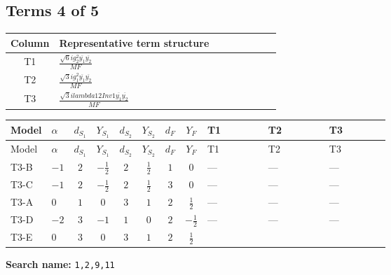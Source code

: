 \documentclass[8pt]{article}
\begin{document}
\begin{landscape}
\subsection*{Terms 4 of 5}
\begin{center}
\begin{tabular}{@{}c >{\raggedright\arraybackslash}p{0.82\linewidth}@{}}
\toprule
Column & Representative term structure \\
\midrule
T1 & \(\displaystyle \frac{\sqrt{6} i g_{2}^{2} \overline{y_{1}} \overline{y_{2}}}{MF}\) \\
\midrule
T2 & \(\displaystyle \frac{\sqrt{3} i g_{1}^{2} \overline{y_{1}} \overline{y_{2}}}{MF}\) \\
\midrule
T3 & \(\displaystyle \frac{\sqrt{3} i lambda12Inv1 \overline{y_{1}} \overline{y_{2}}}{MF}\) \\
\midrule
\bottomrule
\end{tabular}
\end{center}
\smallskip
\tiny
\begin{longtable}{@{}llcccccc >{\raggedright\arraybackslash}p{0.21\linewidth} >{\raggedright\arraybackslash}p{0.21\linewidth} >{\raggedright\arraybackslash}p{0.21\linewidth}@{}}
\toprule
Model & $\alpha$ & $d_{S_1}$ & $Y_{S_1}$ & $d_{S_2}$ & $Y_{S_2}$ & $d_F$ & $Y_F$ & T1 & T2 & T3 \\
\midrule
\endfirsthead
\toprule
Model & $\alpha$ & $d_{S_1}$ & $Y_{S_1}$ & $d_{S_2}$ & $Y_{S_2}$ & $d_F$ & $Y_F$ & T1 & T2 & T3 \\
\midrule
\endhead
T3-B & $-1$ & $2$ & $-\frac{1}{2}$ & $2$ & $\frac{1}{2}$ & $1$ & $0$ & --- & --- & --- \\
\midrule
T3-C & $-1$ & $2$ & $-\frac{1}{2}$ & $2$ & $\frac{1}{2}$ & $3$ & $0$ & --- & --- & --- \\
\midrule
T3-A & $0$ & $1$ & $0$ & $3$ & $1$ & $2$ & $\frac{1}{2}$ & --- & --- & --- \\
\midrule
T3-D & $-2$ & $3$ & $-1$ & $1$ & $0$ & $2$ & $-\frac{1}{2}$ & --- & --- & --- \\
\midrule
T3-E & $0$ & $3$ & $0$ & $3$ & $1$ & $2$ & $\frac{1}{2}$ & \scriptsize\adjustbox{max width=\linewidth}{$\begin{gathered} - \frac{\sqrt{6} i g_{2}^{2} \overline{y_{1}} \overline{y_{2}}}{6 MF}\end{gathered}$} & \scriptsize\adjustbox{max width=\linewidth}{$\begin{gathered} - \frac{\sqrt{3} i g_{1}^{2} \overline{y_{1}} \overline{y_{2}}}{8 MF}\end{gathered}$} & \scriptsize\adjustbox{max width=\linewidth}{$\begin{gathered} \frac{\sqrt{3} i lambda12Inv1 \overline{y_{1}} \overline{y_{2}}}{6 MF}\end{gathered}$} \\
\midrule
\bottomrule
\end{longtable}
\clearpage
\noindent\textbf{Search name: }\texttt{1,2,9,11}\par\smallskip

\end{landscape}
\end{document}

